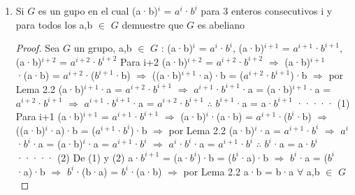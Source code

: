\documentclass[10pt,a4paper,oneside]{article}
\begin{document}
\begin{enumerate}[1.]
\begin{proof}
					\end{proof}
					\item Si $G$ es un gupo en el cual (a·b)$^i$ = $a^i$·$b^i$ para 3 enteros consecutivos i y para todos los a,b $\in$ $G$ demuestre que $G$ es abeliano
					\begin{proof}
						Sea $G$ un grupo, a,b $\in$ $G$ : (a·b)$^{i}$ = $a^i$·$b^i$, (a·b)$^{i+1}$ = $a^{i+1}$·$b^{i+1}$, (a·b)$^{i+2}$ = $a^{i+2}$·$b^{i+2}$ 
						\newline
						Para i+2
						\newline
						(a·b)$^{i+2}$ = $a^{i+2}$·$b^{i+2}$ $\Rightarrow$ (a·b)$^{i+1}$·(a·b) = $a^{i+2}$·($b^{i+1}$·b) $\Rightarrow$ ((a·b)$^{i+1}$·a)·b = ($a^{i+2}$·$b^{i+1}$)·b $\Rightarrow$ por Lema 2.2 (a·b)$^{i+1}$·a = $a^{i+2}$·$b^{i+1}$ $\Rightarrow$ $a^{i+1}$·$b^{i+1}$·a = (a·b)$^{i+1}$·a = $a^{i+2}$·$b^{i+1}$ $\Rightarrow$ $a^{i+1}$·$b^{i+1}$·a = $a^{i+2}$·$b^{i+1}$ $\therefore$ $b^{i+1}$·a = a·$b^{i+1}$ ····· (1)
						\newline
						Para i+1
						\newline(a·b)$^{i+1}$ = $a^{i+1}$·$b^{i+1}$ $\Rightarrow$ (a·b)$^{i}$·(a·b) = $a^{i+1}$·($b^{i}$·b) $\Rightarrow$ ((a·b)$^{i}$·a)·b = ($a^{i+1}$·$b^{i}$)·b $\Rightarrow$ por Lema 2.2 (a·b)$^{i}$·a = $a^{i+1}$·$b^{i}$ $\Rightarrow$ $a^{i}$·$b^{i}$·a = (a·b)$^{i}$·a = $a^{i+1}$·$b^{i}$ $\Rightarrow$ $a^{i}$·$b^{i}$·a = $a^{i+1}$·$b^{i}$ $\therefore$ $b^{i}$·a = a·$b^{i}$ ····· (2)
						\newline
						De (1) y (2)
						a·$b^{i+1}$ = (a·$b^i$)·b = ($b^{i}$·a)·b $\Rightarrow$ $b^{i}$·a  = ($b^{i}$·a)·b $\Rightarrow$ $b^i$·(b·a) = $b^i$·(a·b) $\Rightarrow$ por Lema 2.2 a·b = b·a $\forall$ a,b $\in$ $G$
					\end{proof}
				\end{enumerate}
\end{document}
